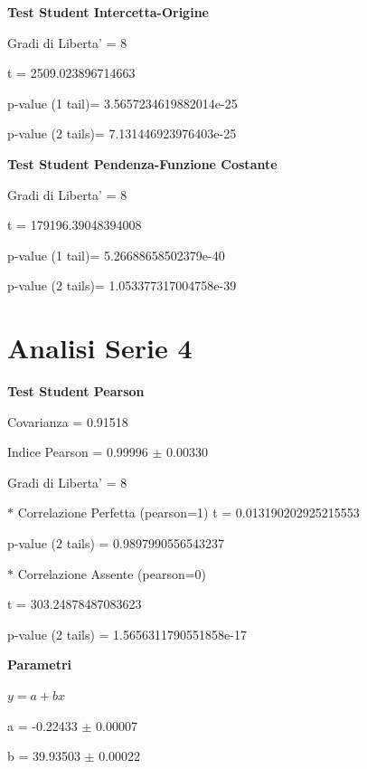 \documentclass{article}
\begin{document}
\textbf{Test Student Intercetta-Origine}

Gradi di Liberta' = 8

t = 2509.023896714663

p-value (1 tail)= 3.5657234619882014e-25

p-value (2 tails)= 7.131446923976403e-25

\textbf{Test Student Pendenza-Funzione Costante}

Gradi di Liberta' = 8

t = 179196.39048394008

p-value (1 tail)= 5.26688658502379e-40

p-value (2 tails)= 1.053377317004758e-39

\section*{Analisi Serie 4}

\textbf{Test Student Pearson}

Covarianza = 0.91518

Indice Pearson = 0.99996 $\pm$ 0.00330

Gradi di Liberta' = 8

$\ast$ Correlazione Perfetta (pearson=1)
t = 0.013190202925215553

p-value (2 tails) = 0.9897990556543237

$\ast$ Correlazione Assente (pearson=0)

t = 303.24878487083623

p-value (2 tails) = 1.5656311790551858e-17

\textbf{Parametri}

$y = a + bx$

a = -0.22433 $\pm$ 0.00007

b = 39.93503 $\pm$ 0.00022
\end{document}
